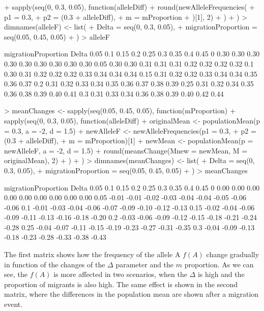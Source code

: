 \documentclass[12pt,a4paper]{paper}
\begin{document}
\begin{enumerate}
\begin{enumerate}
\begin{Schunk}
\begin{Sinput}
{+   sapply(seq(0, 0.3, 0.05), function(alleleDiff) {
+     round(newAlleleFrequencies(
+       p1 = 0.3,
+       p2 = (0.3 + alleleDiff),
+       m = mProportion
+     )[1], 2)
+   })
+ })
> dimnames(alleleF) <- list(
+   Delta = seq(0, 0.3, 0.05),
+   migrationProportion = seq(0.05, 0.45, 0.05)
+ )
> alleleF
\end{Sinput}
\begin{Soutput}
      migrationProportion
Delta  0.05  0.1 0.15  0.2 0.25  0.3 0.35  0.4 0.45
  0    0.30 0.30 0.30 0.30 0.30 0.30 0.30 0.30 0.30
  0.05 0.30 0.30 0.31 0.31 0.31 0.32 0.32 0.32 0.32
  0.1  0.30 0.31 0.32 0.32 0.32 0.33 0.34 0.34 0.34
  0.15 0.31 0.32 0.32 0.33 0.34 0.34 0.35 0.36 0.37
  0.2  0.31 0.32 0.33 0.34 0.35 0.36 0.37 0.38 0.39
  0.25 0.31 0.32 0.34 0.35 0.36 0.38 0.39 0.40 0.41
  0.3  0.31 0.33 0.34 0.36 0.38 0.39 0.40 0.42 0.44
\end{Soutput}
\begin{Sinput}
> meanChanges <- sapply(seq(0.05, 0.45, 0.05), function(mProportion) {
+   sapply(seq(0, 0.3, 0.05), function(alleleDiff) {
+     originalMean <- populationMean(p = 0.3, a = -2, d = 1.5)
+     newAlleleF <- newAlleleFrequencies(p1 = 0.3,
+                                        p2 = (0.3 + alleleDiff),
+                                        m = mProportion)[1]
+     newMean <- populationMean(p = newAlleleF, a = -2, d = 1.5)
+     round(meansChange(Mnew = newMean, M = originalMean), 2)
+   })
+ })
> dimnames(meanChanges) <- list(
+   Delta = seq(0, 0.3, 0.05),
+   migrationProportion = seq(0.05, 0.45, 0.05)
+ )
> meanChanges
\end{Sinput}
\begin{Soutput}
      migrationProportion
Delta   0.05   0.1  0.15   0.2  0.25   0.3  0.35   0.4  0.45
  0     0.00  0.00  0.00  0.00  0.00  0.00  0.00  0.00  0.00
  0.05 -0.01 -0.01 -0.02 -0.03 -0.04 -0.04 -0.05 -0.06 -0.06
  0.1  -0.01 -0.03 -0.04 -0.06 -0.07 -0.09 -0.10 -0.12 -0.13
  0.15 -0.02 -0.04 -0.06 -0.09 -0.11 -0.13 -0.16 -0.18 -0.20
  0.2  -0.03 -0.06 -0.09 -0.12 -0.15 -0.18 -0.21 -0.24 -0.28
  0.25 -0.04 -0.07 -0.11 -0.15 -0.19 -0.23 -0.27 -0.31 -0.35
  0.3  -0.04 -0.09 -0.13 -0.18 -0.23 -0.28 -0.33 -0.38 -0.43
\end{Soutput}
\end{Schunk}
\begin{description}[align=left]
\item [Interpretation:] The first matrix shows how the frequency of the allele A $f(A)$ change gradually in function of the changes of  the $\Delta$ parameter and the $m$ proportion. As we can see, the $f(A)$ is more affected in two scenarios, when the $\Delta$ is high and the proportion of migrants is also high. The same effect is shown in the second matrix, where the differences in the population mean are shown after a migration event.
\end{description}
\end{enumerate}
\end{enumerate}
\end{document}
